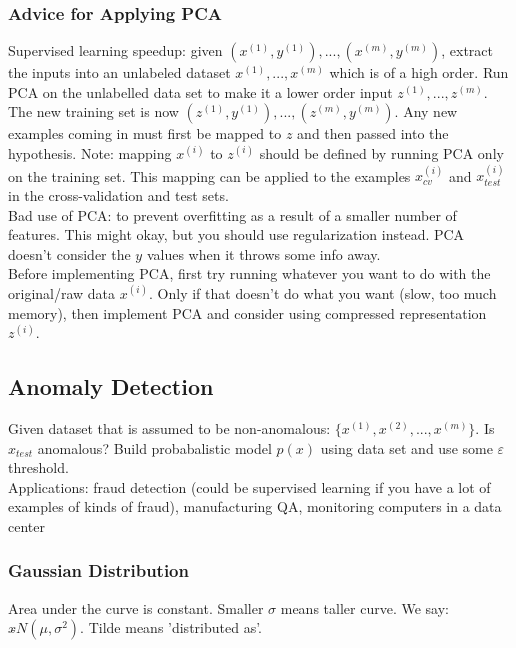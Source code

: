 \documentclass[11pt,letterpaper]{article}
\begin{document}
\subsubsection{Advice for Applying PCA}
Supervised learning speedup: given $(x^{(1)},y^{(1)}),...,(x^{(m)},y^{(m)})$, extract the inputs into an unlabeled dataset $x^{(1)},...,x^{(m)}$ which is of a high order. Run PCA on the unlabelled data set to make it a lower order input $z^{(1)},...,z^{(m)}$. The new training set is now $(z^{(1)},y^{(1)}),...,(z^{(m)},y^{(m)})$. Any new examples coming in must first be mapped to $z$ and then passed into the hypothesis. Note: mapping $x^{(i)}$ to $z^{(i)}$ should be defined by running PCA only on the training set. This mapping can be applied to the examples $x_{cv}^{(i)}$ and $x_{test}^{(i)}$ in the cross-validation and test sets.\\
Bad use of PCA: to prevent overfitting as a result of a smaller number of features. This might okay, but you should use regularization instead. PCA doesn't consider the $y$ values when it throws some info away.\\
Before implementing PCA, first try running whatever you want to do with the original/raw data $x^{(i)}$. Only if that doesn't do what you want (slow, too much memory), then implement PCA and consider using compressed representation $z^{(i)}$.

\subsection{Anomaly Detection}
Given dataset that is assumed to be non-anomalous: $\{ x^{(1)}, x^{(2)}, ..., x^{(m)} \}$. Is $x_{test}$ anomalous? Build probabalistic model $p(x)$ using data set and use some $\varepsilon$ threshold. \\ 
Applications: fraud detection (could be supervised learning if you have a lot of examples of kinds of fraud), manufacturing QA, monitoring computers in a data center

\subsubsection{Gaussian Distribution}
Area under the curve is constant. Smaller $\sigma$ means taller curve. We say: 
$ x \tilde{} N(\mu, \sigma^2) $. Tilde means 'distributed as'. 
\end{document}
